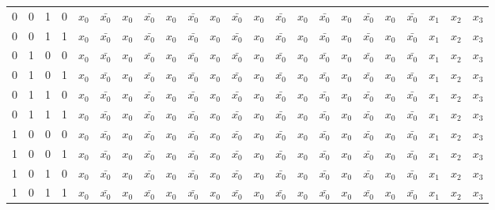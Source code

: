 \documentclass[12pt,openany,a4paper]{book}
\begin{document}
\begin{landscape}
\begin{table}[H]
\begin{tabular}{|cccc|ccccccccccccccccccc|}
    0     & 0     & 1     & 0     & $x_0$ & $\bar{x_0}$ & $x_0$ & $\bar{x_0}$ & $x_0$ & $\bar{x_0}$ & $x_0$ & $\bar{x_0}$ & $x_0$ & $\bar{x_0}$ & $x_0$ & $\bar{x_0}$ & $x_0$ & $\bar{x_0}$ & $x_0$ & $\bar{x_0}$ & $x_1$ & $x_2$ & $x_3$ \\
    0     & 0     & 1     & 1     & $x_0$ & $\bar{x_0}$ & $x_0$ & $\bar{x_0}$ & $x_0$ & $\bar{x_0}$ & $x_0$ & $\bar{x_0}$ & $x_0$ & $\bar{x_0}$ & $x_0$ & $\bar{x_0}$ & $x_0$ & $\bar{x_0}$ & $x_0$ & $\bar{x_0}$ & $x_1$ & $x_2$ & $x_3$ \\
    0     & 1     & 0     & 0     & $x_0$ & $\bar{x_0}$ & $x_0$ & $\bar{x_0}$ & $x_0$ & $\bar{x_0}$ & $x_0$ & $\bar{x_0}$ & $x_0$ & $\bar{x_0}$ & $x_0$ & $\bar{x_0}$ & $x_0$ & $\bar{x_0}$ & $x_0$ & $\bar{x_0}$ & $x_1$ & $x_2$ & $x_3$ \\
    0     & 1     & 0     & 1     & $x_0$ & $\bar{x_0}$ & $x_0$ & $\bar{x_0}$ & $x_0$ & $\bar{x_0}$ & $x_0$ & $\bar{x_0}$ & $x_0$ & $\bar{x_0}$ & $x_0$ & $\bar{x_0}$ & $x_0$ & $\bar{x_0}$ & $x_0$ & $\bar{x_0}$ & $x_1$ & $x_2$ & $x_3$ \\
    0     & 1     & 1     & 0     & $x_0$ & $\bar{x_0}$ & $x_0$ & $\bar{x_0}$ & $x_0$ & $\bar{x_0}$ & $x_0$ & $\bar{x_0}$ & $x_0$ & $\bar{x_0}$ & $x_0$ & $\bar{x_0}$ & $x_0$ & $\bar{x_0}$ & $x_0$ & $\bar{x_0}$ & $x_1$ & $x_2$ & $x_3$ \\
    0     & 1     & 1     & 1     & $x_0$ & $\bar{x_0}$ & $x_0$ & $\bar{x_0}$ & $x_0$ & $\bar{x_0}$ & $x_0$ & $\bar{x_0}$ & $x_0$ & $\bar{x_0}$ & $x_0$ & $\bar{x_0}$ & $x_0$ & $\bar{x_0}$ & $x_0$ & $\bar{x_0}$ & $x_1$ & $x_2$ & $x_3$ \\
    1     & 0     & 0     & 0     & $x_0$ & $\bar{x_0}$ & $x_0$ & $\bar{x_0}$ & $x_0$ & $\bar{x_0}$ & $x_0$ & $\bar{x_0}$ & $x_0$ & $\bar{x_0}$ & $x_0$ & $\bar{x_0}$ & $x_0$ & $\bar{x_0}$ & $x_0$ & $\bar{x_0}$ & $x_1$ & $x_2$ & $x_3$ \\
    1     & 0     & 0     & 1     & $x_0$ & $\bar{x_0}$ & $x_0$ & $\bar{x_0}$ & $x_0$ & $\bar{x_0}$ & $x_0$ & $\bar{x_0}$ & $x_0$ & $\bar{x_0}$ & $x_0$ & $\bar{x_0}$ & $x_0$ & $\bar{x_0}$ & $x_0$ & $\bar{x_0}$ & $x_1$ & $x_2$ & $x_3$ \\
    1     & 0     & 1     & 0     & $x_0$ & $\bar{x_0}$ & $x_0$ & $\bar{x_0}$ & $x_0$ & $\bar{x_0}$ & $x_0$ & $\bar{x_0}$ & $x_0$ & $\bar{x_0}$ & $x_0$ & $\bar{x_0}$ & $x_0$ & $\bar{x_0}$ & $x_0$ & $\bar{x_0}$ & $x_1$ & $x_2$ & $x_3$ \\
    1     & 0     & 1     & 1     & $x_0$ & $\bar{x_0}$ & $x_0$ & $\bar{x_0}$ & $x_0$ & $\bar{x_0}$ & $x_0$ & $\bar{x_0}$ & $x_0$ & $\bar{x_0}$ & $x_0$ & $\bar{x_0}$ & $x_0$ & $\bar{x_0}$ & $x_0$ & $\bar{x_0}$ & $x_1$ & $x_2$ & $x_3$ \\

\end{tabular}
\end{table}
\end{landscape}
\end{document}
